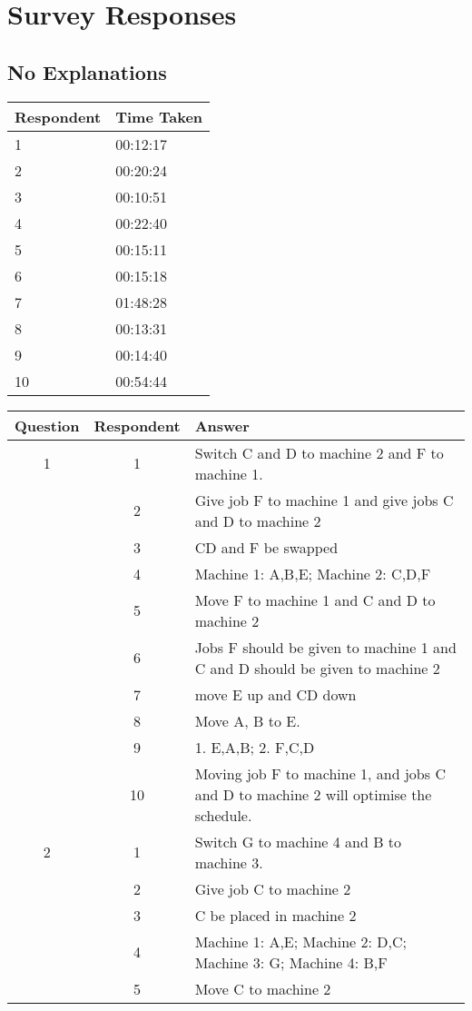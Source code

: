 \chapter{Survey Responses}

\section{No Explanations}
\label{group1data}

\begin{tabular}{l l}
	\hline
	Respondent & Time Taken \\
	\hline
	1 & 00:12:17 \\
	2 & 00:20:24 \\
	3 & 00:10:51 \\
	4 & 00:22:40 \\
	5 & 00:15:11 \\
	6 & 00:15:18 \\
	7 & 01:48:28 \\
	8 & 00:13:31 \\
	9 & 00:14:40 \\
	10 & 00:54:44 \\
	\hline
\end{tabular}
\linespace
\begin{tabularx}{\linewidth}{c c X}
	\hline
	Question & Respondent & Answer \\
	\hline
	1 & 1 & Switch C and D to machine 2 and F to machine 1. \\
	& 2 & Give job F to machine 1 and give jobs C and D to machine 2 \\
	& 3 & CD and F be swapped \\
	& 4 & Machine 1: A,B,E; Machine 2: C,D,F \\
	& 5 & Move F to machine 1 and C and D to machine 2 \\
	& 6 & Jobs F should be given to machine 1 and C and D should be given to machine 2 \\
	& 7 & move E up and CD down  \\
	& 8 & Move A, B to E. \\
	& 9 & 1. E,A,B; 2. F,C,D \\
	& 10 & Moving job F to machine 1, and jobs C and D to machine 2 will optimise the schedule. \\
	\hline
	2 & 1 & Switch G to machine 4 and B to machine 3. \\
	& 2 & Give job C to machine 2 \\
	& 3 & C be placed in machine 2 \\
	& 4 & Machine 1: A,E; Machine 2: D,C; Machine 3: G; Machine 4: B,F \\
	& 5 & Move C to machine 2 \\
\end{tabularx}

